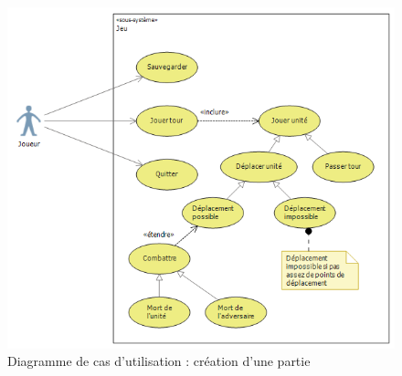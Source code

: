 \begin{figure}[!h]
\centering
\includegraphics[width=\textwidth]{Parties/Images/cdu_TourDeJeu.png}
\caption{Diagramme de cas d'utilisation : création d'une partie}
\label{fig:cdu_TourDeJeu}
\end{figure}